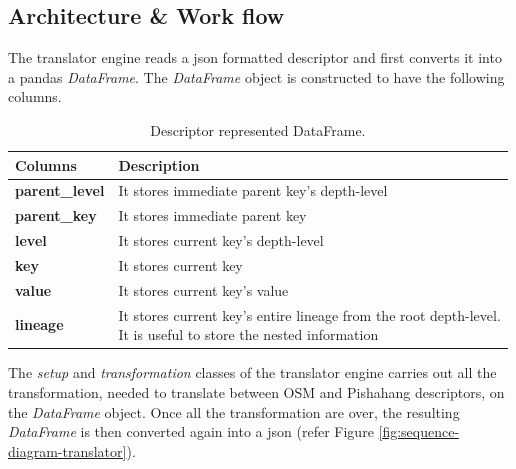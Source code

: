 \subsection{Architecture \& Work flow}
The translator engine reads a json formatted descriptor and first converts it into a pandas \textit{DataFrame}. The \textit{DataFrame} object is constructed to have the following columns.

\begin{table}[H]
	\begin{center}
		\caption{Descriptor represented DataFrame.}
		\label{tab:table1}
		\begin{tabular}{l|l} 
			\textbf{Columns} & \textbf{Description} \\
			\hline
			\textbf{parent\_level} & It stores immediate parent key's depth-level \\ 
			\textbf{parent\_key} & It stores immediate parent key  \\
			\textbf{level} & It stores current key's depth-level \\
			\textbf{key} & It stores current key \\
			\textbf{value} & It stores current key's value \\
			\textbf{lineage} & \makecell[l]{It stores current key's entire lineage from the root depth-level.\\ It is useful to store the nested information} \\  
		\end{tabular}
	\end{center}
\end{table}

The \textit{setup} and \textit{transformation} classes of the translator engine carries out all the transformation, needed to translate between OSM and Pishahang descriptors, on the \textit{DataFrame} object. Once all the transformation are over, the resulting \textit{DataFrame} is then converted again into a json (refer Figure  \ref{fig:sequence-diagram-translator}).


